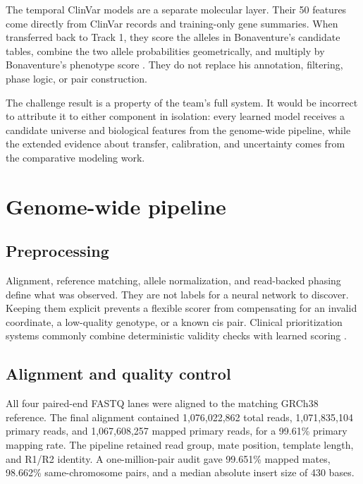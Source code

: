 \documentclass[11pt]{article}
\begin{document}
The temporal ClinVar models are a separate molecular layer. Their 50 features come directly from ClinVar records and training-only gene summaries. When transferred back to Track 1, they score the alleles in Bonaventure's candidate tables, combine the two allele probabilities geometrically, and multiply by Bonaventure's phenotype score \citep{dossourepo2026,tourerepo2026}. They do not replace his annotation, filtering, phase logic, or pair construction.

\begin{tcolorbox}[colback=light,colframe=rust,title=Important attribution rule]
The challenge result is a property of the team's full system. It would be incorrect to attribute it to either component in isolation: every learned model receives a candidate universe and biological features from the genome-wide pipeline, while the extended evidence about transfer, calibration, and uncertainty comes from the comparative modeling work.
\end{tcolorbox}



\section{Genome-wide pipeline}

\subsection{Preprocessing}

Alignment, reference matching, allele normalization, and read-backed phasing define what was observed. They are not labels for a neural network to discover. Keeping them explicit prevents a flexible scorer from compensating for an invalid coordinate, a low-quality genotype, or a known cis pair. Clinical prioritization systems commonly combine deterministic validity checks with learned scoring \citep{stenton2024,maverick2023,aimarrvel2024,aidiva2026}.

\subsection{Alignment and quality control}

All four paired-end FASTQ lanes were aligned to the matching GRCh38 reference. The final alignment contained 1,076,022,862 total reads, 1,071,835,104 primary reads, and 1,067,608,257 mapped primary reads, for a 99.61\% primary mapping rate. The pipeline retained read group, mate position, template length, and R1/R2 identity. A one-million-pair audit gave 99.651\% mapped mates, 98.662\% same-chromosome pairs, and a median absolute insert size of 430 bases.
\end{document}

